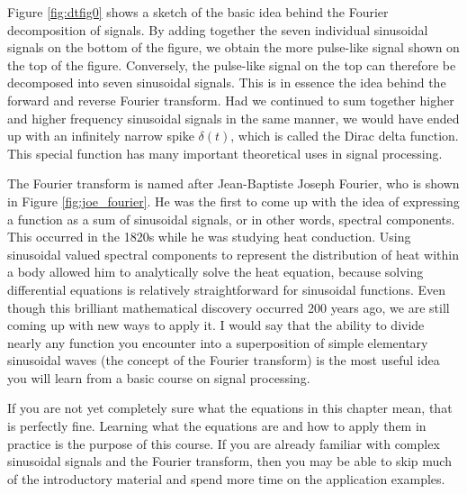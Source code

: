 Figure \ref{fig:dtfig0} shows a sketch of the basic idea behind the
Fourier decomposition of signals. By adding together the seven
individual sinusoidal signals on the bottom of the figure, we obtain
the more pulse-like signal shown on the top of the figure. Conversely,
the pulse-like signal on the top can therefore be decomposed into
seven sinusoidal signals. This is in essence the idea behind the
forward and reverse Fourier transform. Had we continued to sum
together higher and higher frequency sinusoidal signals in the same
manner, we would have ended up with an infinitely narrow spike
$\delta(t)$, which is called the Dirac delta function. This special
function has many important theoretical uses in signal
processing.

The Fourier transform is named after Jean-Baptiste Joseph Fourier, who
is shown in Figure \ref{fig:joe_fourier}. He was the first to come up
with the idea of expressing a function as a sum of sinusoidal signals,
or in other words, spectral components. This occurred in the 1820s
while he was studying heat conduction. Using sinusoidal valued
spectral components to represent the distribution of heat within a
body allowed him to analytically solve the heat equation, because
solving differential equations is relatively straightforward for
sinusoidal functions. Even though this brilliant mathematical
discovery occurred 200 years ago, we are still coming up with new ways
to apply it. I would say that the ability to divide nearly any function you
encounter into a superposition of simple elementary sinusoidal waves
(the concept of the Fourier transform) is the most useful idea you
will learn from a basic course on signal processing.

If you are not yet completely sure what the equations in this chapter
mean, that is perfectly fine. Learning what the equations are and how
to apply them in practice is the purpose of this course. If you are
already familiar with complex sinusoidal signals and the Fourier
transform, then you may be able to skip much of the introductory
material and spend more time on the application examples.


